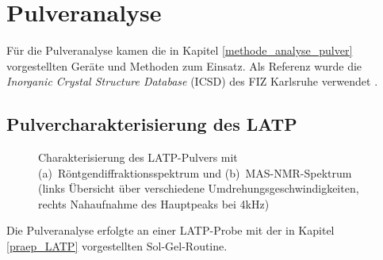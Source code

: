 \documentclass[a4paper, 11pt, headsepline,footsepline,twoside,abstract]{scrbook}
\begin{document}
\section{Pulveranalyse}
Für die Pulveranalyse kamen die in Kapitel \ref{methode_analyse_pulver} vorgestellten Geräte und Methoden zum Einsatz. Als Referenz wurde die \textit{Inorganic Crystal Structure Database} (ICSD) des FIZ Karlsruhe verwendet \cite{icsd}.
\newpage
\subsection{Pulvercharakterisierung des LATP}
\begin{figure}
   \centering
       \vspace{6mm}
       \vspace{3mm}
	\caption{Charakterisierung des LATP-Pulvers mit (a)~Röntgen\-diffraktionsspektrum und (b)~MAS-NMR-Spektrum (links Übersicht über verschiedene Umdrehungsgeschwindigkeiten, rechts Nahaufnahme des Hauptpeaks bei 4kHz)}
   	\label{pulver_LATP}
\end{figure}
Die Pulveranalyse erfolgte an einer LATP-Probe mit der in Kapitel \ref{praep_LATP} vorgestellten Sol-Gel-Routine.
\end{document}
